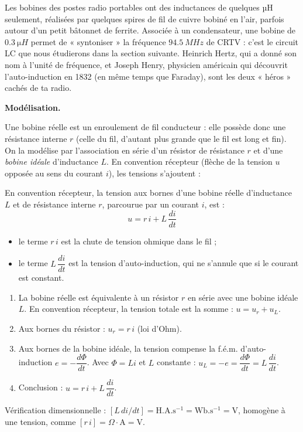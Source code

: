 \documentclass[11pt]{article}
\newcommand{\cle}[1]{{\popxbold\color{popdark}#1}}
\newcounter{popsec}
\newcounter{popsub}
\newcommand{\courssub}[1]{%
  \stepcounter{popsub}%
  \par\vspace{9pt}\noindent{\popxbold\fontsize{11.5}{13}\selectfont\color{popink}{\color{poporange}\thepopsec.\thepopsub}\hspace{6pt}#1}\par\nopagebreak\vspace{4pt}
}
\begin{document}
\begin{savaistu}
Les bobines des postes radio portables ont des inductances de quelques µH seulement, réalisées par quelques spires de fil de cuivre bobiné en l'air, parfois autour d'un petit bâtonnet de ferrite. Associée à un condensateur, une bobine de $\SI{0,3}{\micro H}$ permet de « syntoniser » la fréquence $\SI{94,5}{MHz}$ de CRTV : c'est le circuit LC que nous étudierons dans la section suivante. Heinrich Hertz, qui a donné son nom à l'unité de fréquence, et Joseph Henry, physicien américain qui découvrit l'auto-induction en 1832 (en même temps que Faraday), sont les deux « héros » cachés de ta radio.
\end{savaistu}

\courssub{Tension aux bornes d'une bobine réelle}

\textbf{Modélisation.}\par

Une bobine réelle est un enroulement de fil conducteur : elle possède donc une \cle{résistance interne} $r$ (celle du fil, d'autant plus grande que le fil est long et fin). On la modélise par l'association en série d'un résistor de résistance $r$ et d'une \emph{bobine idéale} d'inductance $L$. En \cle{convention récepteur} (flèche de la tension $u$ opposée au sens du courant $i$), les tensions s'ajoutent :

\begin{propriete}
En convention récepteur, la tension aux bornes d'une bobine réelle d'inductance $L$ et de résistance interne $r$, parcourue par un courant $i$, est :
\[ u = r\,i + L\,\dfrac{di}{dt} \]
\begin{itemize}
\item le terme $r\,i$ est la chute de tension ohmique dans le fil ;
\item le terme $L\,\dfrac{di}{dt}$ est la tension d'auto-induction, qui ne s'annule que si le courant est constant.
\end{itemize}
\end{propriete}

\begin{experience}[Établissement guidé de la relation $u = ri + L\,\dfrac{di}{dt}$]
\begin{enumerate}
\item La bobine réelle est équivalente à un résistor $r$ en série avec une bobine idéale $L$. En convention récepteur, la tension totale est la somme : $u = u_r + u_L$.
\item Aux bornes du résistor : $u_r = r\,i$ (loi d'Ohm).
\item Aux bornes de la bobine idéale, la tension compense la f.é.m. d'auto-induction $e = -\dfrac{d\Phi}{dt}$. Avec $\Phi = Li$ et $L$ constante : $u_L = -e = \dfrac{d\Phi}{dt} = L\,\dfrac{di}{dt}$.
\item Conclusion : $u = r\,i + L\,\dfrac{di}{dt}$.
\end{enumerate}
Vérification dimensionnelle : $[L\,di/dt] = \mathrm{H.A.s^{-1}} = \mathrm{Wb.s^{-1}} = \mathrm{V}$, homogène à une tension, comme $[r\,i] = \Omega\cdot\mathrm{A} = \mathrm{V}$.
\end{experience}
\end{document}
